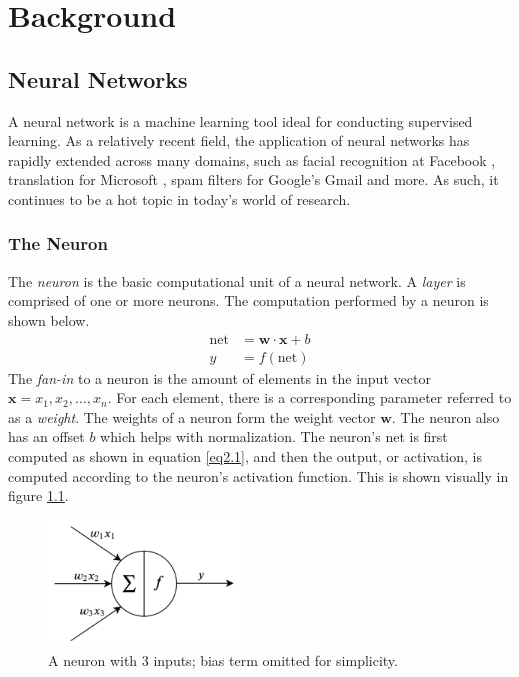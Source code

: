 \chapter{Background}\label{background}
\section{Neural Networks}
A neural network is a machine learning tool ideal for conducting supervised learning. As a relatively recent field, the application of neural networks has rapidly extended across many domains, such as  facial recognition at Facebook \cite{deepface}, translation for Microsoft \cite{translation}, spam filters for Google's Gmail \cite{gmail} and more. As such, it continues to be a hot topic in today's world of research.

\subsection{The Neuron}
The \textit{neuron} is the basic computational unit of a neural network. A \textit{layer} is comprised of one or more neurons. The computation performed by a neuron is shown below.
\begin{align}
\text{net} &= \mathbf{w \cdot x} + b\label{eq2.1}\\
y &= f(\text{net})
\end{align}
The \textit{fan-in} to a neuron is the amount of elements in the input vector $\mathbf{x} = x_1, x_2, \ldots, x_n$. For each element, there is a corresponding parameter referred to as a \textit{weight}. The weights of a neuron form the weight vector $\mathbf{w}$. The neuron also has an offset $b$ which helps with normalization. The neuron's net is first computed as shown in equation \ref{eq2.1}, and then the output, or activation, is computed according to the neuron's activation function. This is shown visually in figure \ref{neuron}.
\begin{figure}
	\centering
	\includegraphics[width=2in]{figures/neuron}
	\caption{A neuron with 3 inputs; bias term omitted for simplicity.}\label{neuron}
\end{figure}

